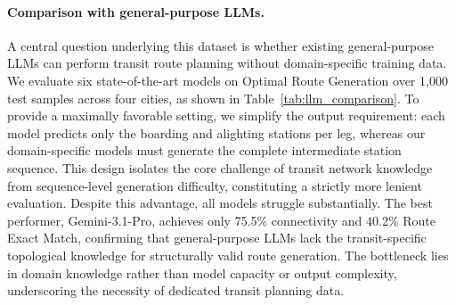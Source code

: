 \documentclass{llmxive}
\begin{document}
\paragraph{Comparison with general-purpose LLMs.}
A central question underlying this dataset is whether existing general-purpose LLMs can perform transit route planning without domain-specific training data. We evaluate six state-of-the-art models on Optimal Route Generation over 1{,}000 test samples across four cities, as shown in Table~\ref{tab:llm_comparison}. To provide a maximally favorable setting, we simplify the output requirement: each model predicts only the boarding and alighting stations per leg, whereas our domain-specific models must generate the complete intermediate station sequence. This design isolates the core challenge of transit network knowledge from sequence-level generation difficulty, constituting a strictly more lenient evaluation. Despite this advantage, all models struggle substantially. The best performer, Gemini-3.1-Pro, achieves only 75.5\% connectivity and 40.2\% Route Exact Match, confirming that general-purpose LLMs lack the transit-specific topological knowledge for structurally valid route generation. The bottleneck lies in domain knowledge rather than model capacity or output complexity, underscoring the necessity of dedicated transit planning data.
\end{document}
